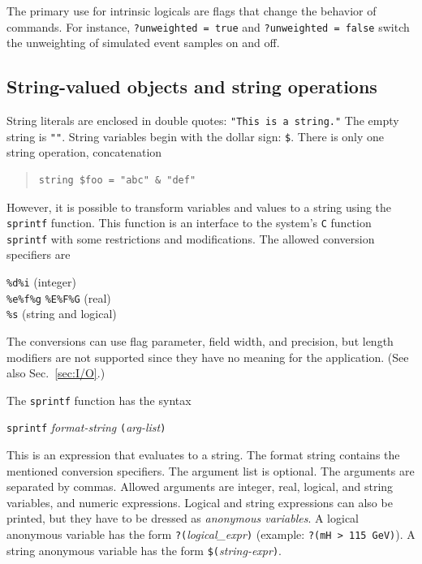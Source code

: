 \documentclass[12pt]{book}
\newcommand{\ttt}[1]{\texttt{#1}}
\begin{document}
The primary use for intrinsic logicals are flags that change the behavior of
commands.  For instance, \ttt{?unweighted = true} and \ttt{?unweighted =
  false} switch the unweighting of simulated event samples on and off.


\subsection{String-valued objects and string operations}
\label{sec:sprintf}

String literals are enclosed in double quotes: \ttt{"This is a string."}
The empty string is \ttt{""}.  String variables begin with the dollar
sign: \verb|$|. There is only one string operation, concatenation
\begin{quote}
\begin{footnotesize}
\begin{verbatim}
string $foo = "abc" & "def"
\end{verbatim}
\end{footnotesize}
\end{quote}

However, it is possible to transform variables and values to a string using
the \ttt{sprintf} function.  This function is an interface to the system's \ttt{C}
function \ttt{sprintf} with some restrictions and modifications.  The allowed
conversion specifiers are
\begin{center}
  \verb|%d|\quad \verb|%i| (integer)
\\
  \verb|%e|\quad \verb|%f|\quad \verb|%g|\quad
  \verb|%E|\quad \verb|%F|\quad \verb|%G| (real)
\\
  \verb|%s| (string and logical)
\end{center}
The conversions can use flag parameter, field width, and precision, but length
modifiers are not supported since they have no meaning for the application.
(See also Sec.~\ref{sec:I/O}.)

The \ttt{sprintf} function has the syntax
\begin{center}
  \ttt{sprintf} \textit{format-string}
  \ttt{(}\textit{arg-list}\ttt{)}
\end{center}
This is an expression that evaluates to a string.  The format string contains
the mentioned conversion specifiers.  The argument list is optional.  The
arguments are separated by commas.  Allowed arguments are integer, real,
logical, and string variables, and numeric expressions.  Logical and string
expressions can also be printed, but they have to be dressed as
\emph{anonymous variables}.  A logical anonymous variable has the form
\ttt{?(}\textit{logical\_expr}\ttt{)} (example: \ttt{?(mH > 115 GeV)}).  A
string anonymous variable has the form \ttt{\$(}\textit{string-expr}\ttt{)}.
\end{document}
